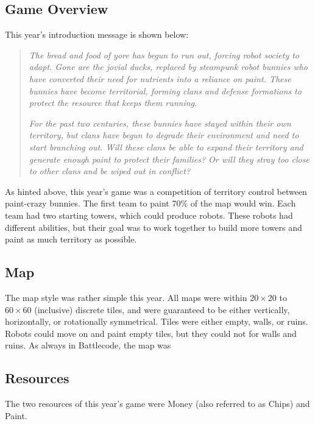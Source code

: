 \documentclass{article}
\begin{document}
  \subsection{Game Overview}

  This year's introduction message is shown below:

  \begin{quote}
    \textit{The bread and food of yore has begun to run out, forcing robot society to adapt. Gone are the jovial ducks, replaced by steampunk robot bunnies who have converted their need for nutrients into a reliance on paint. These bunnies have become territorial, forming clans and defense formations to protect the resource that keeps them running.}
    
    \medskip
    
    \textit{For the past two centuries, these bunnies have stayed within their own territory, but clans have begun to degrade their environment and need to start branching out. Will these clans be able to expand their territory and generate enough paint to protect their families? Or will they stray too close to other clans and be wiped out in conflict?}
  \end{quote}

  As hinted above, this year's game was a competition of territory control between paint-crazy bunnies. The first team to paint 70\% of the map would win. Each team had two starting towers, which could produce robots. These robots had different abilities, but their goal was to work together to build more towers and paint as much territory as possible.

  \subsection{Map}

  The map style was rather simple this year. All maps were within $20 \times 20$ to $60 \times 60$ (inclusive) discrete tiles, and were guaranteed to be either vertically, horizontally, or rotationally symmetrical. Tiles were either empty, walls, or ruins. Robots could move on and paint empty tiles, but they could not for walls and ruins. As always in Battlecode, the map was 

  \subsection{Resources}

  The two resources of this year's game were Money (also referred to as Chips) and Paint.
  
\end{document}
